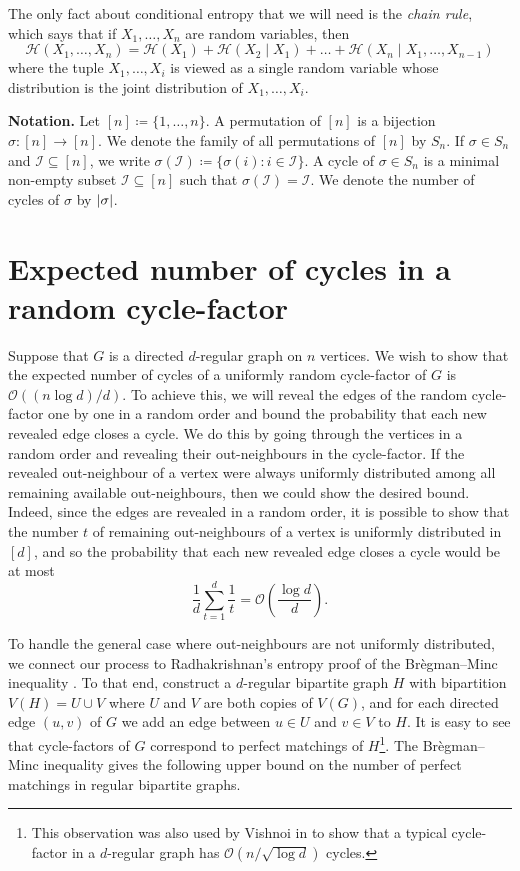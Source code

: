 \documentclass[11pt]{article}
\theoremstyle{plain}
\theoremstyle{definition}
\newcommand{\ent}{\mathcal{H}}
\newcommand{\cI}{\mathcal I}
\newcommand{\cO}{\mathcal O}
\DeclarePairedDelimiter{\abs}{\lvert}{\rvert}
\begin{document}
The only fact about conditional entropy that we will need is the \emph{chain rule}, which says that if $X_1, \dots, X_n$ are random variables, then
\[
    \ent(X_1, \dots, X_n) = \ent(X_1) + \ent(X_2 \mid X_1) + \dots + \ent(X_n \mid X_1, \dots, X_{n-1})
\]
where the tuple $X_1, \dots, X_i$ is viewed as a single random variable whose distribution is the joint distribution of $X_1, \dots, X_i$.

\textbf{Notation.} Let $[n] \coloneqq \{1, \dots, n\}$. A permutation of $[n]$ is a bijection $\sigma: [n] \to [n]$. We denote the family of all permutations of $[n]$ by $S_n$. If $\sigma \in S_n$ and $\cI \subseteq [n]$, we write $\sigma(\cI) \coloneqq \{\sigma(i) : i \in \cI\}$. A cycle of $\sigma \in S_n$ is a minimal non-empty subset $\cI \subseteq [n]$ such that $\sigma(\cI) = \cI$. We denote the number of cycles of $\sigma$ by $\abs{\sigma}$.

\section{Expected number of cycles in a random cycle-factor}
\label{sec:expcyclesincyclefactor}

Suppose that $G$ is a directed $d$-regular graph on $n$ vertices. We wish to show that the expected number of cycles of a uniformly random cycle-factor of $G$ is $\cO((n\log d)/d)$. To achieve this, we will reveal the edges of the random cycle-factor one by one in a random order and bound the probability that each new revealed edge closes a cycle. We do this by going through the vertices in a random order and revealing their out-neighbours in the cycle-factor. If the revealed out-neighbour of a vertex were always uniformly distributed among all remaining available out-neighbours, then we could show the desired bound. Indeed, since the edges are revealed in a random order, it is possible to show that the number $t$ of remaining out-neighbours of a vertex is uniformly distributed in $[d]$, and so the probability that each new revealed edge closes a cycle would be at most
\[
    \frac{1}{d} \sum_{t = 1}^d \frac{1}{t} = \cO\left(\frac{\log d}{d}\right).
\]

To handle the general case where out-neighbours are not uniformly distributed, we connect our process to Radhakrishnan's entropy proof \cite{radhakrishnan1997entropy} of the Br\`{e}gman--Minc inequality \cite{bregman1973some}. To that end, construct a $d$-regular bipartite graph $H$ with bipartition $V(H) = U \cup V$ where $U$ and $V$ are both copies of $V(G)$, and for each directed edge $(u,v)$ of $G$ we add an edge between $u \in U$ and $v \in V$ to $H$. It is easy to see that cycle-factors of $G$ correspond to perfect matchings of $H$\footnote{This observation was also used by Vishnoi in \cite{vishnoi2012permanent} to show that a typical cycle-factor in a $d$-regular graph has $\cO(n/\sqrt{\log d})$ cycles.}. The Br\`{e}gman--Minc inequality gives the following upper bound on the number of perfect matchings in regular bipartite graphs.
\end{document}

